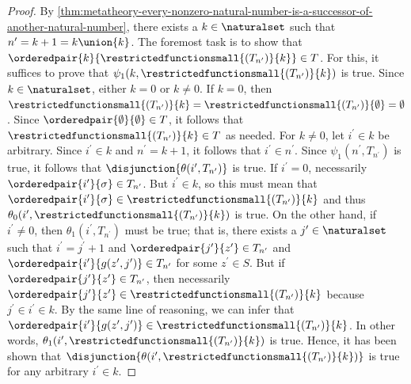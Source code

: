 \begin{proof}
    \vspace{0.1cm}
    \noindent
    By \cref{thm:metatheory-every-nonzero-natural-number-is-a-successor-of-another-natural-number}, there exists a \( k \in \naturalset \) such that
    \( n^{\prime} = k + 1 = k \union \mleft\{ k \mright\} \).
    The foremost task is to show that \( \orderedpair{k}{ \restrictedfunctionsmall{(T_{n^{\prime}})}{k} } \in T \).
    For this, it suffices to prove that \( \psi_{1}(k, \restrictedfunctionsmall{(T_{n^{\prime}})}{k} ) \) is true.
    Since \( k \in \naturalset \), either \( k = 0 \) or \( k \neq 0 \). If \( k = 0 \),  then 
    \( \restrictedfunctionsmall{(T_{n^{\prime}})}{k} = \restrictedfunctionsmall{(T_{n^{\prime}})}{\emptyset} = \emptyset \).
    Since \( \orderedpair{\emptyset}{\emptyset} \in T \), it follows that \( \restrictedfunctionsmall{(T_{n^{\prime}})}{k} \in T \) as needed.
    For \( k \neq 0 \), let \( i^{\prime} \in k \) be arbitrary. Since \( i^{\prime} \in k \) and \( n^{\prime} = k + 1 \), it follows that
    \( i^{\prime} \in n^{\prime} \).
    Since \( \psi_{1}(n^{\prime}, T_{n^{\prime}}) \) is true, it follows that \( \disjunction{\theta(i^{\prime}, T_{n^{\prime}})} \) is true.
    If \( i^{\prime} = 0 \), necessarily \( \orderedpair{i^{\prime}}{\sigma} \in T_{n^{\prime}} \).
    But \( i^{\prime} \in k \), so this must mean that \( \orderedpair{i^{\prime}}{\sigma} \in \restrictedfunctionsmall{(T_{n^{\prime}})}{k} \)
    and thus \( \theta_{0}(i^{\prime}, \restrictedfunctionsmall{(T_{n^{\prime}})}{k} ) \) is true.
    On the other hand, if \( i^{\prime} \neq 0 \), then \( \theta_{1}(i^{\prime}, T_{n^{\prime}}) \) must be true; that is, there exists a
    \( j^{\prime} \in \naturalset \) such that \( i^{\prime} = j^{\prime} + 1 \) and \( \orderedpair{j^{\prime}}{z^{\prime}} \in T_{n^{\prime}} \)
    and \( \orderedpair{i^{\prime}}{g(z^{\prime}, j^{\prime})} \in T_{n^{\prime}} \) for some \( z^{\prime} \in S \).
    But if \( \orderedpair{j^{\prime}}{z^{\prime}} \in T_{n^{\prime}} \), then necessarily
    \(\orderedpair{j^{\prime}}{z^{\prime}} \in \restrictedfunctionsmall{(T_{n^{\prime}})}{k} \) because \( j^{\prime} \in i^{\prime} \in k \).
    By the same line of reasoning, we can infer that \( \orderedpair{i^{\prime}}{g(z^{\prime}, j^{\prime})} \in \restrictedfunctionsmall{(T_{n^{\prime}})}{k} \).
    In other words, \( \theta_{1}(i^{\prime}, \restrictedfunctionsmall{(T_{n^{\prime}})}{k}) \) is true.
    Hence, it has been shown that \( \disjunction{\theta(i^{\prime}, \restrictedfunctionsmall{(T_{n^{\prime}})}{k})} \) is true for any arbitrary 
    \( i^{\prime} \in k \).

\end{proof}
